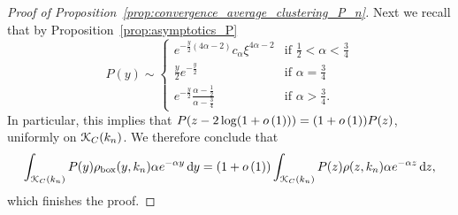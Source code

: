 \begin{proof}[Proof of Proposition~\ref{prop:convergence_average_clustering_P_n}]
Next we recall that by Proposition~\ref{prop:asymptotics_P}
\[
	P(y) \sim \begin{cases}
		e^{-\frac{y}{2}(4\alpha - 2)} c_\alpha \xi^{4\alpha - 2} &\mbox{if } \frac{1}{2} < \alpha < \frac{3}{4}\\
		\frac{y}{2} e^{-\frac{y}{2}} &\mbox{if } \alpha = \frac{3}{4}\\
		e^{-\frac{y}{2}} \frac{\alpha - \frac{1}{2}}{\alpha - \frac{3}{4}} &\mbox{if } \alpha > \frac{3}{4}.
	\end{cases}
\]
In particular, this implies that $P(z - 2\log(1+o\left(1\right))) = (1+o\left(1\right))P(z)$, uniformly on ${\mathcal K}_C(k_n)$. We therefore conclude that
\[
	\int_{{\mathcal K}_{C}(k_n)} P(y) \rho_{\mathrm{box}}(y,k_n) \alpha e^{-\alpha y} \operatorname{\mathrm{d}\hspace{-2pt}} y
		= (1+o\left(1\right)) \int_{{\mathcal K}_{C}(k_n)} P(z) \rho(z,k_n) \alpha e^{-\alpha z} \operatorname{\mathrm{d}\hspace{-2pt}} z,
\]
which finishes the proof.
%
%
%
%
%
%

\end{proof}

